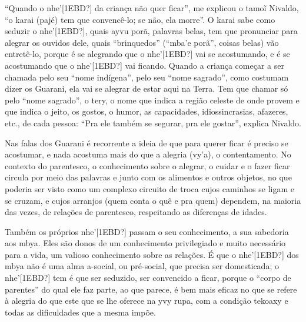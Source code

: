 \documentclass{article}
\begin{document}
{\textquotedblleft}Quando o nhe{\textquoteright}[1EBD?] da crian\c{c}a
n\~ao quer ficar{\textquotedblright}, me explicou o tamo\~{i} Nivaldo,
{\textquotedblleft}o karai (paj\'e) tem que convenc\^e-lo; se n\~ao,
ela morre{\textquotedblright}. O karai sabe como seduzir o
nhe{\textquoteright}[1EBD?], quais ayvu por\~a, palavras belas, tem que
pronunciar para alegrar os ouvidos dele, quais
{\textquotedblleft}brinquedos{\textquotedblright}
({\textquotedblleft}mba{\textquoteright}e por\~a{\textquotedblright},
coisas belas) v\~ao entret\^e-lo, porque \'e se alegrando que o
nhe{\textquoteright}[1EBD?] vai se acostumando, e \'e se acostumando
que o nhe{\textquoteright}[1EBD?] vai ficando. Quando a crian\c{c}a
come\c{c}ar a ser chamada pelo seu {\textquotedblleft}nome
ind\'igena{\textquotedblright}, pelo seu {\textquotedblleft}nome
sagrado{\textquotedblright}, como costumam dizer os Guarani, ela vai se
alegrar de estar aqui na Terra. Tem que chamar s\'o pelo
{\textquotedblleft}nome sagrado{\textquotedblright}, o tery, o nome que
indica a regi\~ao celeste de onde provem e que indica o jeito, os
gostos, o humor, as capacidades, idiossincrasias, afazeres, etc., de
cada pessoa: {\textquotedblleft}Pra ele tamb\'em se segurar, pra ele
gostar{\textquotedblright}, explica Nivaldo.

Nas falas dos Guarani \'e recorrente a ideia de que para querer ficar
\'e preciso se acostumar, e nada acostuma mais do que a alegria
(vy{\textquoteright}a), o contentamento. No contexto do parentesco, o
conhecimento sobre o alegrar, o cuidar e o fazer ficar circula por meio
das palavras e junto com os alimentos e outros objetos, no que poderia
ser visto como um complexo circuito de troca cujos caminhos se ligam e
se cruzam, e cujos arranjos (quem conta o qu\^e e pra quem) dependem,
na maioria das vezes, de rela\c{c}\~oes de parentesco, respeitando as
diferen\c{c}as de idades.

Tamb\'em os pr\'oprios nhe{\textquoteright}[1EBD?] passam o seu
conhecimento, a sua sabedoria aos mbya. Eles s\~ao donos de um
conhecimento privilegiado e muito necess\'ario para a vida, um valioso
conhecimento sobre as rela\c{c}\~oes. \'E que o
nhe{\textquoteright}[1EBD?] dos mbya n\~ao \'e uma alma a-social, ou
pr\'e-social, que precisa ser domesticada; o
nhe{\textquoteright}[1EBD?] tem \'e que ser seduzido, ser convencido a
ficar, porque o {\textquotedblleft}corpo de
parentes{\textquotedblright} do qual ele faz parte, ao que parece, \'e
bem mais eficaz no que se refere \`a alegria do que este que se lhe
oferece na yvy rupa, com a condi\c{c}\~ao tekoaxy e todas as
dificuldades que a mesma imp\~oe.
\end{document}
